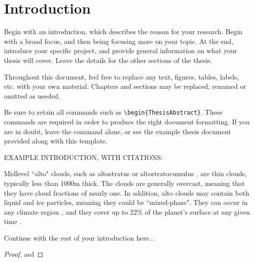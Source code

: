 \documentclass[master]{UWMThesis}
\begin{document}

\chapter{Introduction} \label{sec:intro}

Begin with an introduction, which describes the reason for your research.  Begin with a broad focus, and then being focusing more on your topic.  At the end, introduce your specific project, and provide general information on what your thesis will cover.  Leave the details for the other sections of the thesis.

Throughout this document, feel free to replace any text, figures, tables, labels, etc. with your own material.  Chapters and sections may be replaced, renamed or omitted as needed.

Be sure to retain all commands such as \verb=\begin{ThesisAbstract}=.  These commands are required in order to produce the right document formatting.  If you are in doubt, leave the command alone, or see the example thesis document provided along with this template.

EXAMPLE INTRODUCTION, WITH CITATIONS:

Midlevel ``alto" clouds, such as altostratus or altostratocumulus \citep{larson_et_al_06a}, are thin clouds, typically less than 1000m thick.  The clouds are generally overcast, meaning that they have cloud fractions of nearly one.  In addition, alto clouds may contain both liquid and ice particles, meaning they could be ``mixed-phase".  They can occur in any climate region \citep{sassen_khvorostyanov_07a}, and they cover up to 22\% of the planet's surface at any given time \citep{warren_et_al_88a,warren_et_al_88b}.

Continue with the rest of your introduction here...

\begin{proof}
	asd
\end{proof}


\end{document}
